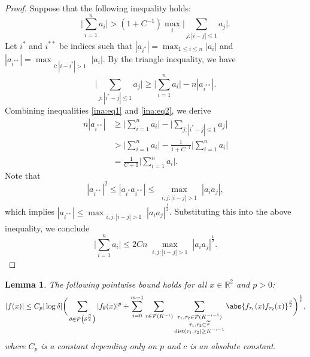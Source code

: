 \documentclass[reqno,centertags,11pt,a4paper]{amsart}
\newtheorem{lemma}[definition]{Lemma}
\begin{document}
\begin{proof}
    Suppose that the following inequality holds:
    \begin{equation}\label{ina:eq1}
        \bigg|\sum_{i=1}^n a_i\bigg|> \left(1+C^{-1}\right)\max_{i}\bigg|\sum_{j:|i-j|\leq1}a_j\bigg|.
    \end{equation}
    Let $i^*$ and $i^{**}$ be indices such that $|a_{i^*}|=\max_{1\leq i\leq n}|a_i|$ and $|a_{i^{**}}|=\max_{\substack{i:|i-i^*|>1}}|a_i|$. By the triangle inequality, we have
    \begin{equation}\label{ina:eq2}
        \bigg|\sum_{j:|i^*-j|\leq1}a_j\bigg|\geq \bigg|\sum_{i=1}^n a_i\bigg|-n|a_{i^{**}}|.
    \end{equation}
    Combining inequalities \eqref{ina:eq1} and \eqref{ina:eq2}, we derive
    \begin{align*}
        n|a_{i^{**}}|&\geq \bigg|\sum_{i=1}^n a_i\bigg| - \bigg|\sum_{j:|i^*-j|\leq1}a_j\bigg| \\
        &> \bigg|\sum_{i=1}^n a_i\bigg| - \frac{1}{1+C^{-1}}\bigg|\sum_{i=1}^n a_i\bigg| \\
        &= \frac{1}{C+1}\bigg|\sum_{i=1}^n a_i\bigg|.
    \end{align*}
    Note that
    \begin{equation*}
        |a_{i^{**}}|^2 \leq |a_{i^*}a_{i^{**}}| \leq \max_{\substack{i,j:|i-j|>1}}|a_ia_j|,
    \end{equation*}
    which implies $|a_{i^{**}}|\leq \max_{\substack{i,j:|i-j|>1}}|a_ia_j|^{\frac{1}{2}}$. Substituting this into the above inequality, we conclude
    \begin{equation*}
        \bigg|\sum_{i=1}^n a_i\bigg|\leq 2C n\max_{\substack{i,j:|i-j|>1}}|a_ia_j|^{\frac{1}{2}}.
    \end{equation*}
\end{proof}

\begin{lemma}\label{br-na}
The following pointwise bound holds for all $x\in\mathbb{R}^2$ and $p>0$:
\begin{equation}\label{br-na:eq1}
    |f(x)| \leq C_p |\log\delta|\bigg(
        \sum_{\theta \in \mathcal{P}\bigl(\delta^{\frac{\beta}{2}}\bigr)} |f_\theta(x)|^p
        + \sum_{i=0}^{m-1} \sum_{\tau \in \mathcal{P}(K^{-i})}
          \sum_{\substack{ \tau_1,\tau_2 \in \mathcal{P}(K^{-i-1}) \\
                          \tau_1,\tau_2 \subset \widetilde{\tau} \\
                          \operatorname{dist}(\tau_1,\tau_2) \geq  K^{-i-1} }}
          \abs{f_{\tau_1}(x)f_{\tau_2}(x)}^{\frac{p}{2}}
    \bigg)^{\frac{1}{p}},
\end{equation}
where $C_p$ is a constant depending only on $p$ and $c$ is an absolute constant.
\end{lemma}
\end{document}
